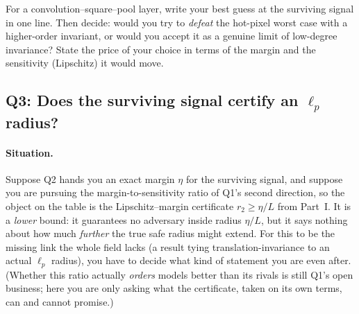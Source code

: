 \begin{problem}
For a convolution--square--pool layer, write your best guess at the surviving signal in one line.
Then decide: would you try to \emph{defeat} the hot-pixel worst case with a higher-order invariant,
or would you accept it as a genuine limit of low-degree invariance? State the price of your choice in
terms of the margin and the sensitivity (Lipschitz) it would move.
\end{problem}

\subsection{Q3: Does the surviving signal certify an $\ell_p$ radius?}
\label{sub:p2-q3}

\paragraph{Situation.} Suppose Q2 hands you an exact margin $\eta$ for the surviving signal, and
suppose you are pursuing the margin-to-sensitivity ratio of Q1's second direction, so the object on
the table is the Lipschitz--margin certificate $r_2 \ge \eta/L$ from Part~I. It is a \emph{lower}
bound: it guarantees no adversary inside radius $\eta/L$, but it says nothing about how much
\emph{further} the true safe radius might extend. For this to be the missing link the whole field
lacks (a result tying translation-invariance to an actual $\ell_p$ radius), you have to decide
what kind of statement you are even after. (Whether this ratio actually \emph{orders} models better
than its rivals is still Q1's open business; here you are only asking what the certificate, taken on
its own terms, can and cannot promise.)

